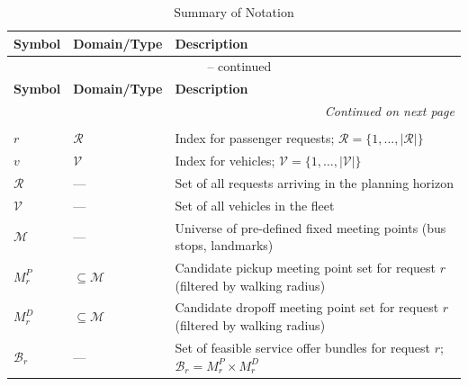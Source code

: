 
\begin{longtable}{@{}lll@{}}
\caption{Summary of Notation}\label{tab:notation}\\
\toprule
\textbf{Symbol} & \textbf{Domain/Type} & \textbf{Description} \\
\midrule
\endfirsthead
\multicolumn{3}{c}{\tablename\ \thetable{} -- continued}\\
\toprule
\textbf{Symbol} & \textbf{Domain/Type} & \textbf{Description} \\
\midrule
\endhead
\midrule
\multicolumn{3}{r}{\textit{Continued on next page}}\\
\endfoot
\bottomrule
\endlastfoot

\multicolumn{3}{l}{\textbf{Sets and Indices}} \\
\midrule
$r$ & $\mathcal{R}$ & Index for passenger requests; $\mathcal{R} = \{1,\ldots,|\mathcal{R}|\}$ \\
$v$ & $\mathcal{V}$ & Index for vehicles; $\mathcal{V} = \{1,\ldots,|\mathcal{V}|\}$ \\
$\mathcal{R}$ & --- & Set of all requests arriving in the planning horizon \\
$\mathcal{V}$ & --- & Set of all vehicles in the fleet \\
$\mathcal{M}$ & --- & Universe of pre-defined fixed meeting points (bus stops, landmarks) \\
$M_r^P$ & $\subseteq \mathcal{M}$ & Candidate pickup meeting point set for request $r$ (filtered by walking radius) \\
$M_r^D$ & $\subseteq \mathcal{M}$ & Candidate dropoff meeting point set for request $r$ (filtered by walking radius) \\
$\mathcal{B}_r$ & --- & Set of feasible service offer bundles for request $r$; $\mathcal{B}_r = M_r^P \times M_r^D$ \\
\midrule


\end{longtable}
